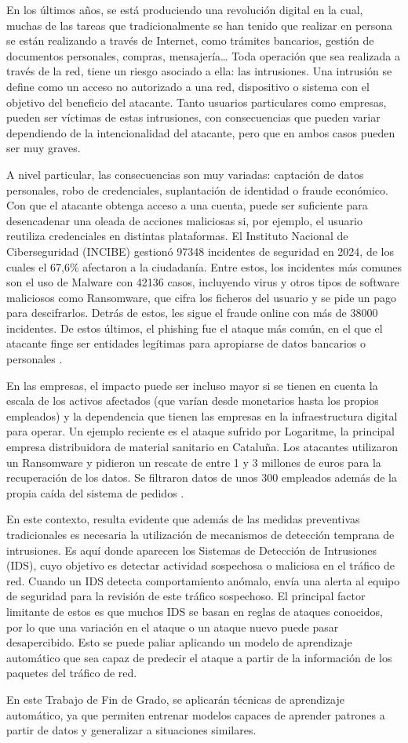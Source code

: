 En los últimos años, se está produciendo una revolución digital en la cual, muchas de las tareas que tradicionalmente se han tenido que realizar en persona se están realizando a través de Internet, como trámites bancarios, gestión de documentos personales, compras, mensajería… Toda operación que sea realizada a través de la red, tiene un riesgo asociado a ella: las intrusiones. Una intrusión se define como un acceso no autorizado a una red, dispositivo o sistema con el objetivo del beneficio del atacante. Tanto usuarios particulares como empresas, pueden ser víctimas de estas intrusiones, con consecuencias que pueden variar dependiendo de la intencionalidad del atacante, pero que en ambos casos pueden ser muy graves.

A nivel particular, las consecuencias son muy variadas: captación de datos personales, robo de credenciales, suplantación de identidad o fraude económico. Con que el atacante obtenga acceso a una cuenta, puede ser suficiente para desencadenar una oleada de acciones maliciosas si, por ejemplo, el usuario reutiliza credenciales en distintas plataformas. El Instituto Nacional de Ciberseguridad (INCIBE) gestionó 97348 incidentes de seguridad en 2024, de los cuales el 67,6\% afectaron a la ciudadanía. Entre estos, los incidentes más comunes son el uso de Malware con 42136 casos, incluyendo virus y otros tipos de software maliciosos como Ransomware, que cifra los ficheros del usuario y se pide un pago para descifrarlos. Detrás de estos, les sigue el fraude online con más de 38000 incidentes. De estos últimos, el phishing fue el ataque más común, en el que el atacante finge ser entidades legítimas para apropiarse de datos bancarios o personales \cite{incibe2025balance}.

En las empresas, el impacto puede ser incluso mayor si se tienen en cuenta la escala de los activos afectados (que varían desde monetarios hasta los propios empleados) y la dependencia que tienen las empresas en la infraestructura digital para operar. Un ejemplo reciente es el ataque sufrido por Logaritme, la principal empresa distribuidora de material sanitario en Cataluña. Los atacantes utilizaron un Ransomware y pidieron un rescate de entre 1 y 3 millones de euros para la recuperación de los datos. Se filtraron datos de unos 300 empleados además de la propia caída del sistema de pedidos \cite{carranco2025logaritme}.

En este contexto, resulta evidente que además de las medidas preventivas tradicionales es necesaria la utilización de mecanismos de detección temprana de intrusiones. Es aquí donde aparecen los Sistemas de Detección de Intrusiones (IDS), cuyo objetivo es detectar actividad sospechosa o maliciosa en el tráfico de red. Cuando un IDS detecta comportamiento anómalo, envía una alerta al equipo de seguridad para la revisión de este tráfico sospechoso. El principal factor limitante de estos es que muchos IDS se basan en reglas de ataques conocidos, por lo que una variación en el ataque o un ataque nuevo puede pasar desapercibido. Esto se puede paliar aplicando un modelo de aprendizaje automático que sea capaz de predecir el ataque a partir de la información de los paquetes del tráfico de red.

En este Trabajo de Fin de Grado, se aplicarán técnicas de aprendizaje automático, ya que permiten entrenar modelos capaces de aprender patrones a partir de datos y generalizar a situaciones similares.
